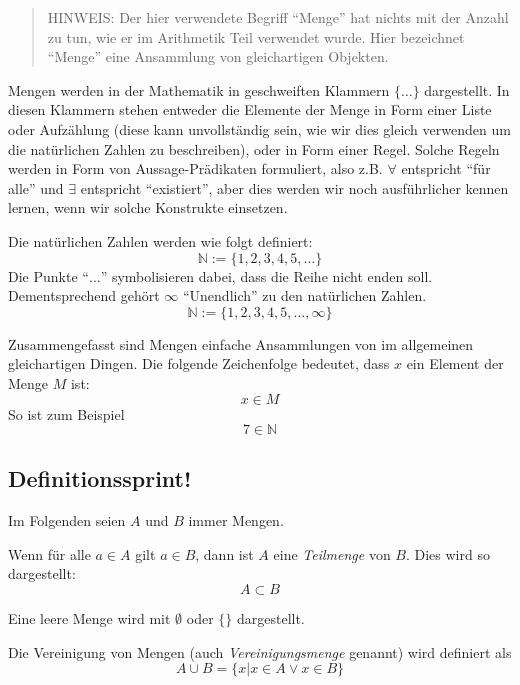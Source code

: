 \begin{quote}
HINWEIS: Der hier verwendete Begriff "`Menge"' hat nichts mit der Anzahl zu tun, wie er im Arithmetik Teil verwendet wurde. Hier bezeichnet "`Menge"' eine Ansammlung von gleichartigen Objekten.
\end{quote}

Mengen werden in der Mathematik in geschweiften Klammern $\{\dots \}$ dargestellt. In diesen Klammern stehen entweder die Elemente der Menge in Form einer Liste oder Aufzählung (diese kann unvollständig sein, wie wir dies gleich verwenden um die natürlichen Zahlen zu beschreiben), oder in Form einer Regel. Solche Regeln werden in Form von Aussage-Prädikaten formuliert, also z.B. $\forall$ entspricht "`für alle"' und $\exists$ entspricht "`existiert"', aber dies werden wir noch ausführlicher kennen lernen, wenn wir solche Konstrukte einsetzen. 

Die natürlichen Zahlen werden wie folgt definiert:
\[\mathbb{N} := \{ 1,2,3,4,5, \dots \} \]
Die Punkte "`$\dots$"' symbolisieren dabei, dass die Reihe nicht enden soll. Dementsprechend gehört $\infty$ "`Unendlich"' zu den natürlichen Zahlen.
\[\mathbb{N} := \{ 1,2,3,4,5, \dots, \infty \} \]

Zusammengefasst sind Mengen einfache Ansammlungen von im allgemeinen gleichartigen Dingen. Die folgende Zeichenfolge bedeutet, dass $x$ ein Element der Menge $M$ ist:
\[x \in M \]
So ist zum Beispiel
\[7 \in \mathbb{N} \]

\subsection{Definitionssprint!}
Im Folgenden seien $A$ und $B$ immer Mengen.

\begin{definition}
Wenn für alle $a\in A$ gilt $a\in B$, dann ist $A$ eine \emph{Teilmenge} von $B$. Dies wird so dargestellt:
\[
A \subset B
\]
\end{definition}

\begin{definition}
Eine leere Menge wird mit $\emptyset$ oder $\{\}$ dargestellt.
\end{definition}

\begin{definition}
Die Vereinigung von Mengen (auch \emph{Vereinigungsmenge} genannt) wird definiert als
\[A \cup B = \{ x | x\in A \vee x\in B \}\]
\end{definition}

